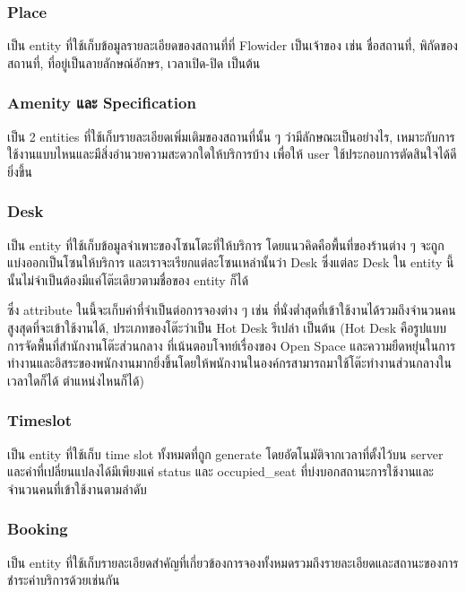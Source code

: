 \subsubsection{Place}
เป็น entity ที่ใช้เก็บข้อมูลรายละเอียดของสถานที่ที่ Flowider เป็นเจ้าของ เช่น ชื่อสถานที่, พิกัดของสถานที่, ที่อยู่เป็นลายลักษณ์อักษร, เวลาเปิด-ปิด เป็นต้น

\subsubsection{Amenity และ Specification}
เป็น 2 entities ที่ใช้เก็บรายละเอียดเพิ่มเติมของสถานที่นั้น ๆ ว่ามีลักษณะเป็นอย่างไร, เหมาะกับการใช้งานแบบไหนและมีสิ่งอำนวยความสะดวกใดให้บริการบ้าง เพื่อให้ user ใช้ประกอบการตัดสินใจได้ดียิ่งขึ้น

\subsubsection{Desk}
เป็น entity ที่ใช้เก็บข้อมูลจำเพาะของโซนโตะที่ให้บริการ โดยแนวคิดคือพื้นที่ของร้านต่าง ๆ จะถูกแบ่งออกเป็นโซนให้บริการ และเราจะเรียกแต่ละโซนเหล่านั้นว่า Desk ซึ่งแต่ละ Desk ใน entity นี้นั้นไม่จำเป็นต้องมีแค่โต๊ะเดียวตามชื่อของ entity ก็ได้

ซึ่ง attribute ในนี้จะเก็บค่าที่จำเป็นต่อการจองต่าง ๆ เช่น ที่นั่งต่ำสุดที่เข้าใช้งานได้รวมถึงจำนวนคนสูงสุดที่จะเข้าใช้งานได้, ประเภทของโต๊ะว่าเป็น Hot Desk รึเปล่า เป็นต้น (Hot Desk คือรูปแบบการจัดพื้นที่สำนักงานโต๊ะส่วนกลาง ที่เน้นตอบโจทย์เรื่องของ Open Space และความยืดหยุ่นในการทำงานและอิสระของพนักงานมากยิ่งขึ้นโดยให้พนักงานในองค์กรสามารถมาใช้โต๊ะทำงานส่วนกลางในเวลาใดก็ได้ ตำแหน่งไหนก็ได้)

\subsubsection{Timeslot}
เป็น entity ที่ใช้เก็บ time slot ทั้งหมดที่ถูก generate โดยอัตโนมัติจากเวลาที่ตั้งไว้บน server และค่าที่เปลี่ยนแปลงได้มีเพียงแค่ status และ occupied\_seat ที่บ่งบอกสถานะการใช้งานและจำนวนคนที่เข้าใช้งานตามลำดับ

\subsubsection{Booking}
เป็น entity ที่ใช้เก็บรายละเอียดสำคัญที่เกี่ยวข้องการจองทั้งหมดรวมถึงรายละเอียดและสถานะของการชำระค่าบริการด้วยเช่นกัน

